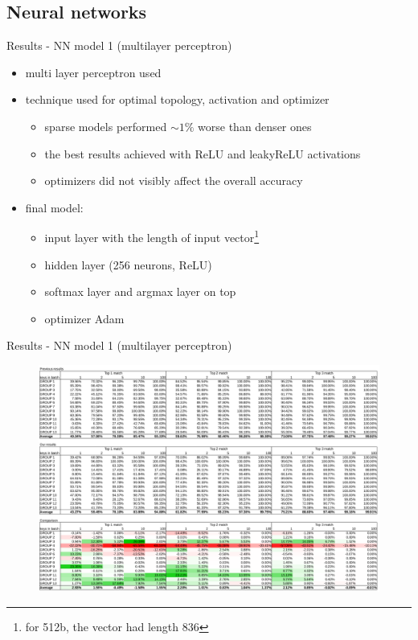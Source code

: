 \documentclass{beamer}
\let\oldfootnote\footnote
\renewcommand\footnote[1][]{\oldfootnote[frame,#1]}
\begin{document}
\begin{darkframes}
    \subsection{Neural networks}
    \begin{frame}{Results - NN model 1 (multilayer perceptron)}
      \begin{itemize}
        \item multi layer perceptron used
        \item {} technique used for optimal topology, activation and optimizer
        \begin{itemize}
          \item sparse models performed $\sim 1 \%$  worse than denser ones
          \item the best results achieved with ReLU and leakyReLU activations
          \item optimizers did not visibly affect the overall accuracy
        \end{itemize}
        \item final model:
        \begin{itemize}
          \item input layer with the length of input vector\footnote{for 512b, the vector had length 836}
          \item hidden layer (256 neurons, ReLU)
          \item softmax layer and argmax layer on top
          \item optimizer Adam
        \end{itemize}
      \end{itemize}
    \end{frame}

    \begin{frame}{Results - NN model 1 (multilayer perceptron)}
      \begin{figure}[H]
        \centering
        \includegraphics[width=0.98\linewidth]{../tex/images/results/comparison_13.png}
      \end{figure}  
    \end{frame}


\end{darkframes}
\end{document}

